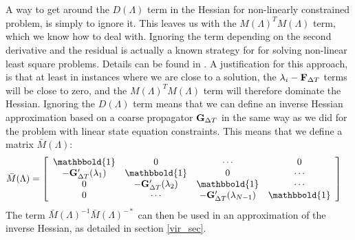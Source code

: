 \\
\\
A way to get around the $D(\Lambda)$ term in the Hessian for non-linearly constrained problem, is simply to ignore it. This leaves us with the $M(\Lambda)^TM(\Lambda)$ term, which we know how to deal with. Ignoring the term depending on the second derivative and the residual is actually a known strategy for for solving non-linear least square problems. Details can be found in \cite{nocedal2006numerical}. A justification for this approach, is that at least in instances where we are close to a solution, the $\lambda_i-\bold F_{\Delta T}$ terms will be close to zero, and the $M(\Lambda)^TM(\Lambda)$ term will therefore dominate the Hessian. Ignoring the $D(\Lambda)$ term means that we can define an inverse Hessian approximation based on a coarse propagator $\bold G_{\Delta T}$ in the same way as we did for the problem with linear state equation constraints. This means that we define a matrix $\bar M(\Lambda)$:
\begin{align*}
\bar M(\Lambda) &= \left[ \begin{array}{cccc}
   \mathbbold{1} & 0 & \cdots & 0 \\  
   -\bold{G}_{\Delta T}'(\lambda_{1}) & \mathbbold{1} & 0 & \cdots \\ 
   0 &-\bold{G}_{\Delta T}'(\lambda_{2}) & \mathbbold{1}  & \cdots \\
   0 &\cdots &-\bold{G}_{\Delta T}'(\lambda_{N-1}) & \mathbbold{1}  \\
   \end{array}  \right]
\end{align*}
The term $\bar{M}(\Lambda)^{-1}\bar{M}(\Lambda)^{-*}$ can then be used in an approximation of the inverse Hessian, as detailed in section \ref{vir_sec}.
